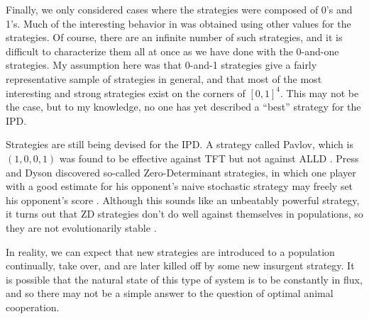 \documentclass{article}
\begin{document}
Finally, we only considered cases where the strategies were composed of 0's and 1's. Much of the interesting behavior in \cite{nowak_game-dynamical_1989} was obtained using other values for the strategies. Of course, there are an infinite number of such strategies, and it is difficult to characterize them all at once as we have done with the 0-and-one strategies. My assumption here was that 0-and-1 strategies give a fairly representative sample of strategies in general, and that most of the most interesting and strong strategies exist on the corners of \([0, 1]^4\). This may not be the case, but to my knowledge, no one has yet described a ``best'' strategy for the IPD.

Strategies are still being devised for the IPD. A strategy called Pavlov, which is \((1, 0, 0, 1)\) was found to be effective against TFT but not against ALLD \cite{nowak_strategy_1993}. Press and Dyson discovered so-called Zero-Determinant strategies, in which one player with a good estimate for his opponent's naive stochastic strategy may freely set his opponent's score \cite{press_iterated_2012}. Although this sounds like an unbeatably powerful strategy, it turns out that ZD strategies don't do well against themselves in populations, so they are not evolutionarily stable \cite{adami2013evolutionary}.

In reality, we can expect that new strategies are introduced to a population continually, take over, and are later killed off by some new insurgent strategy. It is possible that the natural state of this type of system is to be constantly in flux, and so there may not be a simple answer to the question of optimal animal cooperation.

{}

\end{document}
